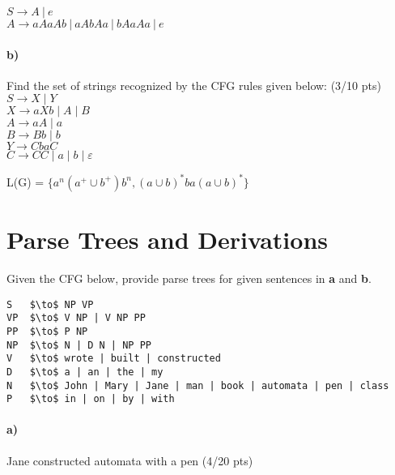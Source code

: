 \documentclass[a4paper,12pt]{article}
\begin{document}
\begin{tcolorbox}
$S \to A\ |\ e$ \\
$A \to aAaAb\ |\ aAbAa\ |\ bAaAa\ |\ e$ \\
\end{tcolorbox}



\paragraph{b)} Find the set of strings recognized by the CFG rules given below:         \hfill \small{(3/10 pts)} \\


$S \to X \mid Y$ \\
$X \to aXb \mid A \mid B$ \\
$A \to aA \mid a$ \\
$B \to Bb \mid b$ \\
$Y \to CbaC$ \\
$C \to CC \mid a \mid b \mid \varepsilon$  \\

\begin{tcolorbox}
L(G) = $\{a^n(a^+\cup b^+)b^n, (a\cup b)^*ba(a\cup b)^* \}$
\end{tcolorbox}


\newpage
\section{Parse Trees and Derivations \hfill {}}
Given the CFG below, provide parse trees for given sentences in \textbf{a} and \textbf{b}.\\

\begin{lstlisting}[style=output,mathescape=true]
S   $\to$ NP VP
VP  $\to$ V NP | V NP PP
PP  $\to$ P NP
NP  $\to$ N | D N | NP PP
V   $\to$ wrote | built | constructed
D   $\to$ a | an | the | my
N   $\to$ John | Mary | Jane | man | book | automata | pen | class
P   $\to$ in | on | by | with
\end{lstlisting}

\paragraph{a)} Jane constructed automata with a pen \hfill \small{(4/20 pts)} \\

\begin{tcolorbox}
\end{tcolorbox}
\end{document}
